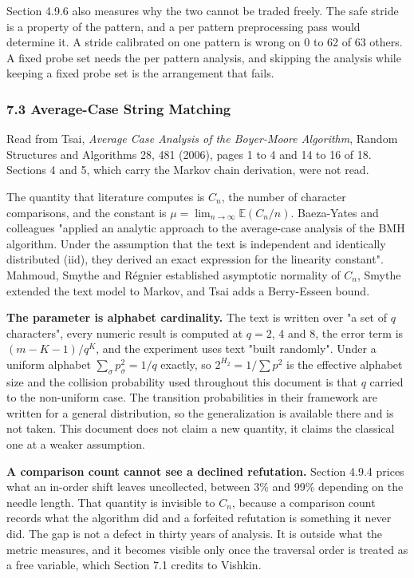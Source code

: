Section 4.9.6 also measures why the two cannot be traded freely. The safe stride is a property of the pattern, and a per pattern preprocessing pass would determine it. A stride calibrated on one pattern is wrong on 0 to 62 of 63 others. A fixed probe set needs the per pattern analysis, and skipping the analysis while keeping a fixed probe set is the arrangement that fails.

\subsubsection{7.3 Average-Case String Matching}

Read from Tsai, \emph{Average Case Analysis of the Boyer-Moore Algorithm}, Random Structures and Algorithms 28, 481 (2006), pages 1 to 4 and 14 to 16 of 18. Sections 4 and 5, which carry the Markov chain derivation, were not read.

The quantity that literature computes is \(C_n\), the number of character comparisons, and the constant is \(\mu = \lim_{n\to\infty} \mathbb{E}(C_n/n)\). Baeza-Yates and colleagues "applied an analytic approach to the average-case analysis of the BMH algorithm. Under the assumption that the text is independent and identically distributed (iid), they derived an exact expression for the linearity constant". Mahmoud, Smythe and Régnier established asymptotic normality of \(C_n\), Smythe extended the text model to Markov, and Tsai adds a Berry-Esseen bound.

\noindent\textbf{The parameter is alphabet cardinality.} The text is written over "a set of \(q\) characters", every numeric result is computed at \(q = 2\), 4 and 8, the error term is \((m-K-1)/q^K\), and the experiment uses text "built randomly". Under a uniform alphabet \(\sum_\sigma p_\sigma^2 = 1/q\) exactly, so \(2^{H_2} = 1/\sum p^2\) is the effective alphabet size and the collision probability used throughout this document is that \(q\) carried to the non-uniform case. The transition probabilities in their framework are written for a general distribution, so the generalization is available there and is not taken. This document does not claim a new quantity, it claims the classical one at a weaker assumption.

\noindent\textbf{A comparison count cannot see a declined refutation.} Section 4.9.4 prices what an in-order shift leaves uncollected, between 3\% and 99\% depending on the needle length. That quantity is invisible to \(C_n\), because a comparison count records what the algorithm did and a forfeited refutation is something it never did. The gap is not a defect in thirty years of analysis. It is outside what the metric measures, and it becomes visible only once the traversal order is treated as a free variable, which Section 7.1 credits to Vishkin.


